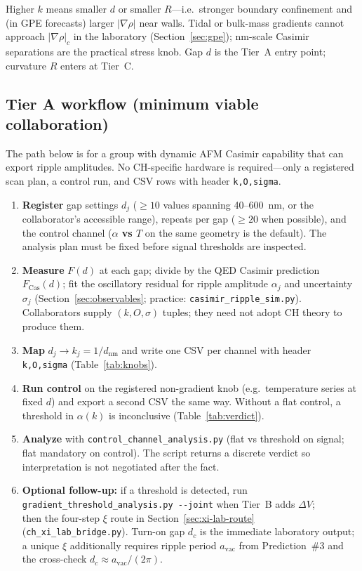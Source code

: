 \documentclass[11pt,a4paper]{article}
\newcommand{\py}[1]{\nolinkurl{#1}}
\begin{document}
Higher $k$ means smaller $d$ or smaller $R$---i.e.\ stronger boundary confinement and (in GPE forecasts) larger $|\nabla\rho|$ near walls.
Tidal or bulk-mass gradients cannot approach $|\nabla\rho|_c$ in the laboratory (Section~\ref{sec:gpe}); nm-scale Casimir separations are the practical stress knob.
Gap $d$ is the Tier~A entry point; curvature $R$ enters at Tier~C.

\subsection{Tier A workflow (minimum viable collaboration)}

The path below is for a group with dynamic AFM Casimir capability that can export ripple amplitudes.
No CH-specific hardware is required---only a registered scan plan, a control run, and CSV rows with header \texttt{k,O,sigma}.

\begin{enumerate}[label=\textbf{Step \arabic*:}, leftmargin=*]
  \item \textbf{Register} gap settings $d_j$ ($\geq 10$ values spanning 40--600~nm, or the collaborator's accessible range), repeats per gap ($\geq 20$ when possible), and the control channel (\textbf{$\alpha$ vs $T$} on the same geometry is the default).
  The analysis plan must be fixed before signal thresholds are inspected.

  \item \textbf{Measure} $F(d)$ at each gap; divide by the QED Casimir prediction $F_{\mathrm{Cas}}(d)$; fit the oscillatory residual for ripple amplitude $\alpha_j$ and uncertainty $\sigma_j$ (Section~\ref{sec:observables}; practice: \texttt{casimir\_ripple\_sim.py}).
  Collaborators supply $(k, O, \sigma)$ tuples; they need not adopt CH theory to produce them.

  \item \textbf{Map} $d_j \to k_j = 1/d_{\mathrm{nm}}$ and write one CSV per channel with header \texttt{k,O,sigma} (Table~\ref{tab:knobs}).

  \item \textbf{Run control} on the registered non-gradient knob (e.g.\ temperature series at fixed $d$) and export a second CSV the same way.
  Without a flat control, a threshold in $\alpha(k)$ is inconclusive (Table~\ref{tab:verdict}).

  \item \textbf{Analyze} with \py{control_channel_analysis.py} (flat vs threshold on signal; flat mandatory on control).
  The script returns a discrete verdict so interpretation is not negotiated after the fact.

  \item \textbf{Optional follow-up:} if a threshold is detected, run \py{gradient_threshold_analysis.py --joint} when Tier~B adds $\Delta V$;\\
  then the four-step $\xi$ route in Section~\ref{sec:xi-lab-route} (\py{ch_xi_lab_bridge.py}).
  Turn-on gap $d_c$ is the immediate laboratory output; a unique $\xi$ additionally requires ripple period $a_{\mathrm{vac}}$ from Prediction~\#3 and the cross-check $d_c \approx a_{\mathrm{vac}}/(2\pi)$.
\end{enumerate}
\end{document}

